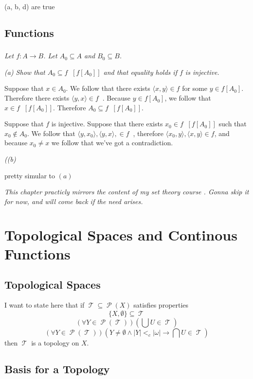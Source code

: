 \documentclass[11pt,oneside,titlepage]{book}
\DeclareMathOperator \pow {\mathcal {P}}
\DeclareMathOperator \topol {\mathcal {T}}
\DeclareMathOperator \inv {^{-1}}
\newcommand{\eangle}[1]{\langle #1 \rangle}
\newcommand{\set}[1]{\{ #1 \}}
\begin{document}
(a, b, d) are true

\section{Functions}

\subsection{}

\textit{Let $f: A \to B$. Let $A_0 \subseteq A$ and $B_0 \subseteq B$.}

\textit{(a) Show that $A_0 \subseteq f\inv[f[A_0]]$ and that equality holds
  if $f$ is injective.}

Suppose that $x \in A_0$. We follow that there exists $\eangle{x, y} \in f$ for some
$y \in f[A_0]$. Therefore there exists $\eangle{y, x} \in f\inv$. Because $y \in f[A_0]$,
we follow that $x \in f\inv[f[A_0]]$. Therefore $A_0 \subseteq f\inv[f[A_0]]$.

Suppose that $f$ is injective. Suppose that there exists $x_0 \in f\inv[f[A_0]]$ such that
$x_0 \notin A_0$. We follow that $\eangle{y, x_0}, \eangle{y, x}, \in f\inv$,
therefore $\eangle{x_0, y}, \eangle{x, y} \in f$, and because $x_0 \neq x$ we follow
that we've got a contradiction.

\textit{((b) }

pretty simular to $(a)$

\textit{This chapter practicly mirrors the content of my set theory course
  . Gonna skip it for now, and will come back if the need arises.}

\chapter{Topological Spaces and Continous Functions}

\section{Topological Spaces}

I want to state here that if $\topol \subseteq \pow(X)$ satisfies
properties
$$\set{X, \emptyset} \subseteq \topol$$
$$(\forall Y \in \pow(\topol))( \bigcup{U} \in \topol)$$
$$(\forall Y \in \pow(\topol))(Y \neq \emptyset \land |Y| <_c
|\omega|  \to \bigcap{U} \in \topol)$$
then $\topol$ is a topology on $X$.

\section{Basis for a Topology}
\end{document}
